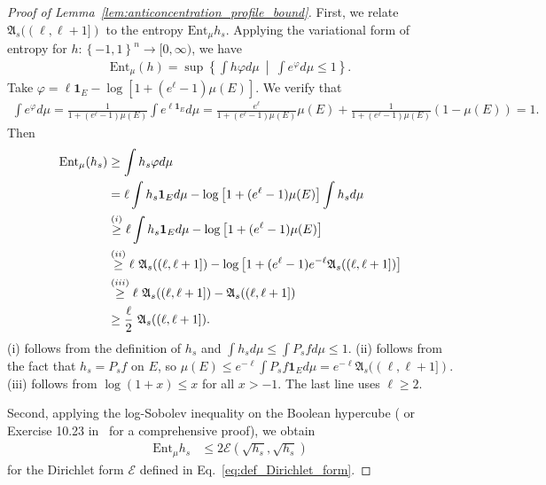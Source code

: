 \documentclass[11pt]{article}
\newcommand{\fA}{\mathfrak{A}}
\newcommand{\dirichlet}{\mathcal{E}}
\theoremstyle{named}
\theoremstyle{plain}
\newcommand{\Ent}{\text{Ent}}
\newcommand{\brackets}[1]{\left[ #1 \right]}
\newcommand{\braces}[1]{\left\{ #1 \right \}}
\begin{document}
\begin{proof}[Proof of Lemma~\ref{lem:anticoncentration_profile_bound}]
  First, we relate $\fA_{s}((\ell, \ell+1])$ to the entropy $\Ent_\mu h_s$. Applying the variational form of entropy for $h: \braces{-1, 1}^n \to [0, \infty)$, we have
  \begin{align*}
    \Ent_\mu(h) = \sup \braces{\int h \varphi d\mu \ \middle| \ \int e^{\varphi} d\mu \leq 1}.
  \end{align*}
  Take $\varphi = \ell \mathbf{1}_{E} - \log \brackets{1 + (e^{\ell} - 1) \mu(E)}$. We verify that
  \begin{align*}
    \int e^{\varphi} d\mu = \frac{1}{1+ (e^{\ell} - 1) \mu(E)} \int e^{\ell \mathbf{1}_{E}} d\mu = \frac{e^{\ell}}{1 + (e^{\ell} - 1) \mu(E)} \mu(E) + \frac{1}{1 + (e^{\ell} - 1) \mu(E)} (1 - \mu(E)) = 1.
  \end{align*}
  Then
  \begin{align}
    \label{eq:entropy_vs_anti_concentration_profile}
    \Ent_\mu(h_s) &\geq \int h_s \varphi d\mu \notag \\
    &= \ell \int h_s \mathbf{1}_{E} d\mu - \log \brackets{1 + (e^{\ell} - 1) \mu(E)} \int h_s d\mu \notag \\
    &\overset{(i)}{\geq} \ell \int h_s \mathbf{1}_{E} d\mu - \log \brackets{1 + (e^{\ell} - 1) \mu(E)} \notag \\
    &\overset{(ii)}{\geq} \ell \ \fA_{s} ((\ell, \ell+1]) - \log \brackets{1 + (e^{\ell} - 1) e^{-\ell} \fA_{s} ((\ell, \ell+1])} \notag \\ 
    &\overset{(iii)}{\geq} \ell \ \fA_{s} ((\ell, \ell+1]) -  \fA_{s} ((\ell, \ell+1]) \notag \\ 
    &\geq \frac{\ell}{2} \ \fA_{s} ((\ell, \ell+1]).
  \end{align}
  (i) follows from the definition of $h_s$ and $\int h_s d\mu \leq \int P_s f d\mu \leq 1$. (ii) follows from the fact that $h_s = P_s f$ on $E$, so $\mu(E) \leq e^{-\ell} \int P_s f \mathbf{1}_{E} d\mu = e^{-\ell} \fA_{s} ((\ell, \ell+1])$. (iii) follows from $\log(1+x) \leq x$ for all $x > -1$. The last line uses $\ell \geq 2$.

  Second, applying the log-Sobolev inequality on the Boolean hypercube (\cite{gross1975logarithmic} or Exercise 10.23 in~\cite{o2014analysis} for a comprehensive proof), we obtain
  \begin{align}
    \label{eq:app_log_sobolev}
    \Ent_\mu h_s &\leq 2 \dirichlet(\sqrt{h_s}, \sqrt{h_s})
  \end{align}
  for the Dirichlet form $\dirichlet$ defined in Eq.~\eqref{eq:def_Dirichlet_form}. 


\end{proof}
\end{document}
